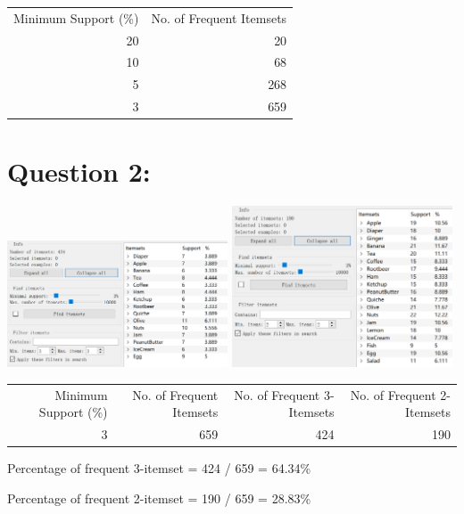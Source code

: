 \documentclass[titlepage]{article}
\begin{document}
\begin{center}
\begin{tabular}{rr}
\hline
Minimum Support (\%) & No. of Frequent Itemsets\\
20 & 20\\
10 & 68\\
5 & 268\\
3 & 659\\
\hline
\end{tabular}
\end{center}

\section{Question 2:}
\label{sec:orga826084}
\begin{center}
\includegraphics[width=0.49\textwidth]{minsup3_3.PNG}
\includegraphics[width=0.49\textwidth]{minsup3_2.PNG}
\end{center}

\begin{center}
\begin{tabular}{rrrr}
\hline
Minimum Support (\%) & No. of Frequent Itemsets & No. of Frequent 3-Itemsets & No. of Frequent 2-Itemsets\\
3 & 659 & 424 & 190\\
\hline
\end{tabular}
\end{center}

Percentage of frequent 3-itemset = 424 / 659 = 64.34\%

Percentage of frequent 2-itemset = 190 / 659 = 28.83\%
\end{document}
